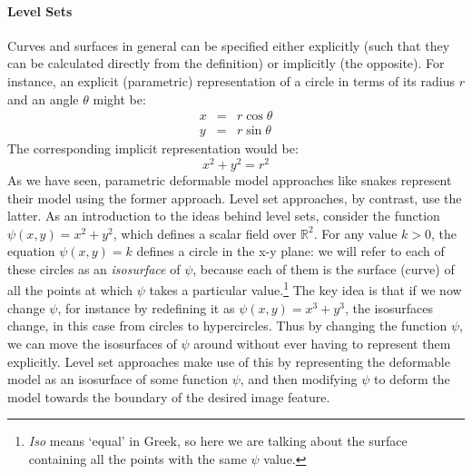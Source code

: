 \paragraph{Level Sets}

Curves and surfaces in general can be specified either explicitly (such that they can be calculated directly from the definition) or implicitly (the opposite). For instance, an explicit (parametric) representation of a circle in terms of its radius $r$ and an angle $\theta$ might be:
%
\begin{eqnarray*}
x & = & r \cos \theta \\
y & = & r \sin \theta
\end{eqnarray*}
%
The corresponding implicit representation would be:
%
\[
x^2 + y^2 = r^2
\]
%
As we have seen, parametric deformable model approaches like snakes represent their model using the former approach. Level set approaches, by contrast, use the latter. As an introduction to the ideas behind level sets, consider the function $\psi(x,y) = x^2 + y^2$, which defines a scalar field over $\mathbb{R}^2$. For any value $k > 0$, the equation $\psi(x,y) = k$ defines a circle in the x-y plane: we will refer to each of these circles as an \emph{isosurface} of $\psi$, because each of them is the surface (curve) of all the points at which $\psi$ takes a particular value.\footnote{\emph{Iso} means `equal' in Greek, so here we are talking about the surface containing all the points with the same $\psi$ value.} The key idea is that if we now change $\psi$, for instance by redefining it as $\psi(x,y) = x^3 + y^3$, the isosurfaces change, in this case from circles to hypercircles. Thus by changing the function $\psi$, we can move the isosurfaces of $\psi$ around without ever having to represent them explicitly. Level set approaches make use of this by representing the deformable model as an isosurface of some function $\psi$, and then modifying $\psi$ to deform the model towards the boundary of the desired image feature.



